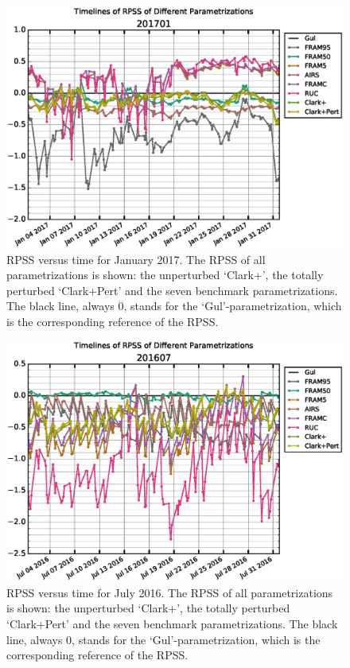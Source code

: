 \begin{landscape}
    \begin{figure}[p]
        \centering
        \includegraphics{graphics/results/RPS-201701.eps}
        \caption[Timeline of RPSS for January 2017 ]{RPSS versus time for January 2017. The RPSS of all parametrizations is shown: the unperturbed `Clark+', the totally perturbed `Clark+Pert' and the seven benchmark parametrizations. The black line, always 0, stands for the `Gul'-parametrization, which is the corresponding reference of the RPSS.  }
        \label{fig: RPS_jan}
    \end{figure}
    \begin{figure}[p]
        \centering
        \includegraphics{graphics/results/RPS-201607.eps}
        \caption[Timeline of RPSS for July 2017]{RPSS versus time for July 2016. The RPSS of all parametrizations is shown: the unperturbed `Clark+', the totally perturbed `Clark+Pert' and the seven benchmark parametrizations. The black line, always 0, stands for the `Gul'-parametrization, which is the corresponding reference of the RPSS.}
        \label{fig: RPS_july}
    \end{figure}
\end{landscape}
\FloatBarrier

